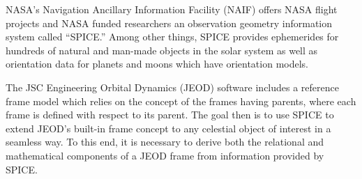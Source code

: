 NASA's Navigation Ancillary Information Facility (NAIF) offers NASA flight
projects and NASA funded researchers an observation geometry information
system called ``SPICE.'' Among other things, SPICE provides ephemerides for
hundreds of natural and man-made objects in the solar system as well as
orientation data for planets and moons which have orientation models.

The JSC Engineering Orbital Dynamics (JEOD) software includes a reference
frame model which relies on the concept of the frames having parents, where
each frame is defined with respect to its parent. The goal then is to use
SPICE to extend JEOD's built-in frame concept to any celestial object of
interest in a seamless way. To this end, it is necessary to derive both the
relational and mathematical components of a JEOD frame from information
provided by SPICE.
